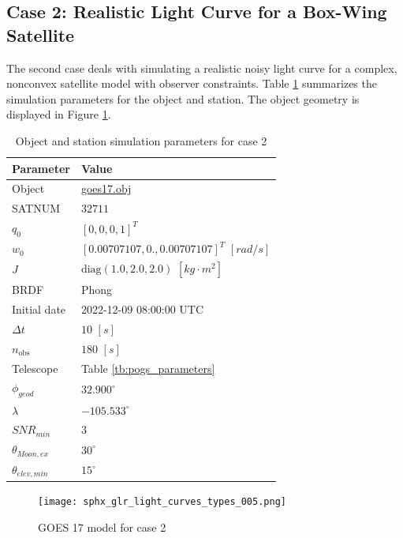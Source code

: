 \subsection{Case 2: Realistic Light Curve for a Box-Wing Satellite} \label{sec:case2}

The second case deals with simulating a realistic noisy light curve for a complex, nonconvex satellite model with observer constraints. Table \ref{tb:case2_obj_props} summarizes the simulation parameters for the object and station. The object geometry is displayed in Figure \ref{fig:case2_obj}.

\begin{table}[]
  \centering
  \begin{tabular}{|l|l|}
  \hline
  \textbf{Parameter} & \textbf{Value} \\ \hline
  Object & \href{https://raw.githubusercontent.com/liamrobinson1/Light-Curve-Models/main/accurate_sats/matlib_goes17.obj}{goes17.obj} \\ \hline
  SATNUM & $32711$ \\ \hline
  $q_0$ & $\left[ 0, 0, 0, 1 \right]^T$ \\ \hline
  $w_0$ & $\left[ 0.00707107, 0.,         0.00707107 \right]^T$ $[rad/s]$ \\ \hline
  $J$ & $\mathrm{diag}\left( 1.0, 2.0, 2.0 \right)$ $\left[ kg \cdot m^2 \right]$ \\ \hline
  BRDF & Phong \\ \hline
  Initial date & 2022-12-09 08:00:00 UTC \\ \hline
  $\Delta t$ & $10$ $[s]$ \\ \hline
  $n_\mathrm{obs}$ & $180$ $[s]$ \\ \hline
  Telescope & Table \ref{tb:pogs_parameters} \\ \hline
  $\phi_{geod}$ & $32.900^\circ$ \\ \hline
  $\lambda$ & $-105.533^\circ$ \\ \hline
  $SNR_{min}$ & $3$ \\ \hline
  $\theta_{Moon,ex}$ & $30^\circ$ \\ \hline
  $\theta_{elev,min}$ & $15^\circ$ \\ \hline
  \end{tabular}
  \caption{Object and station simulation parameters for case 2}
  \label{tb:case2_obj_props}
\end{table}

\begin{figure}[!htb]
  \centering
  \texttt{[image: sphx\_glr\_light\_curves\_types\_005.png]}
  \caption{GOES 17 model for case 2}
  \label{fig:case2_obj}
\end{figure}

